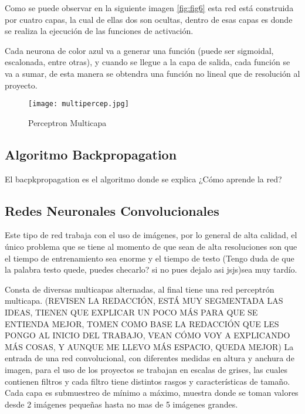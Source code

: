             Como se puede observar en la siguiente imagen \eqref{fig:fig6} esta red est\'a
            construida por cuatro capas, la cual de ellas dos son ocultas, dentro de esas 
            capas es donde se realiza la ejecuci\'on de las funciones de activaci\'on.

            Cada neurona de color azul va a generar una funci\'on (puede ser sigmoidal, escalonada, entre otras), 
            y cuando se llegue a la capa de salida, cada funci\'on se va a sumar, de esta manera 
            se obtendra una funci\'on no lineal que de resoluci\'on al proyecto.

            \begin{figure}[H]
                \centering
                \texttt{[image: multipercep.jpg]}
                \caption{Perceptron Multicapa}
                \label{fig:fig6}
            \end{figure}

            
        \subsection{Algoritmo Backpropagation}
            El bacpkpropagation es el algoritmo donde se explica ¿C\'omo aprende la red?


        \subsection{Redes Neuronales Convolucionales}

            Este tipo de red trabaja con el uso de imágenes, por lo general de alta calidad, el \'unico problema que se tiene 
            al momento de que sean de alta resoluciones son que el tiempo de entrenamiento sea enorme y el tiempo de testo (Tengo duda de que la palabra testo quede, puedes checarlo? si no pues dejalo asi jsjs)sea muy tardío.

            Consta de diversas multicapas alternadas, al final tiene una red perceptr\'on multicapa. (REVISEN LA REDACCIÓN, ESTÁ MUY SEGMENTADA LAS IDEAS, TIENEN QUE EXPLICAR UN POCO MÁS PARA QUE SE ENTIENDA MEJOR, TOMEN COMO BASE LA REDACCIÓN QUE LES PONGO AL INICIO DEL TRABAJO, VEAN CÓMO VOY A EXPLICANDO MÁS COSAS, Y AUNQUE ME LLEVO MÁS ESPACIO, QUEDA MEJOR)
            La entrada de una red convolucional, con diferentes medidas en altura y anchura de imagen, para el uso 
            de los proyectos se trabajan en escalas de grises, las cuales contienen filtros y cada filtro tiene distintos 
            rasgos y características de tamaño. Cada capa es submuestreo de m\'inimo a m\'aximo, muestra donde se toman valores 
            desde 2 im\'agenes pequeñas hasta no mas de 5 im\'agenes grandes.

